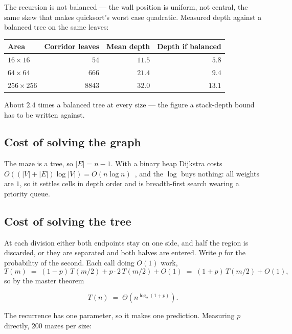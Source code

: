 The recursion is not balanced --- the wall position is uniform, not central, the
same skew that makes quicksort's worst case quadratic. Measured depth against a
balanced tree on the same leaves:

\begin{center}
\begin{tabular}{@{}lrrr@{}}
  \toprule
  Area & Corridor leaves & Mean depth & Depth if balanced \\
  \midrule
  $16\times16$   & $54$   & $11.5$ & $5.8$ \\
  $64\times64$   & $666$  & $21.4$ & $9.4$ \\
  $256\times256$ & $8843$ & $32.0$ & $13.1$ \\
  \bottomrule
\end{tabular}
\end{center}

About $2.4$ times a balanced tree at every size --- the figure a stack-depth
bound has to be written against.

\subsection{Cost of solving the graph}

The maze is a tree, so $|E|=n-1$. With a binary heap Dijkstra costs
$O((|V|+|E|)\log|V|)=O(n\log n)$~\cite[Ch.~22]{cormen2022introduction}, and the
$\log$ buys nothing: all weights are $1$, so it settles cells in depth order and
is breadth-first search wearing a priority queue.

\subsection{Cost of solving the tree}

At each division either both endpoints stay on one side, and half the region is
discarded, or they are separated and both halves are entered. Write $p$ for the
probability of the second. Each call doing $O(1)$ work,
\[
  T(m) \;=\; (1-p)\,T(m/2) + p\cdot 2\,T(m/2) + O(1) \;=\; (1+p)\,T(m/2)+O(1),
\]
so by the master theorem

\begin{keypoint}
\[ T(n)\;=\;\Theta\!\left(n^{\log_2(1+p)}\right). \]
\end{keypoint}

The recurrence has one parameter, so it makes one prediction. Measuring $p$
directly, $200$ mazes per size:

